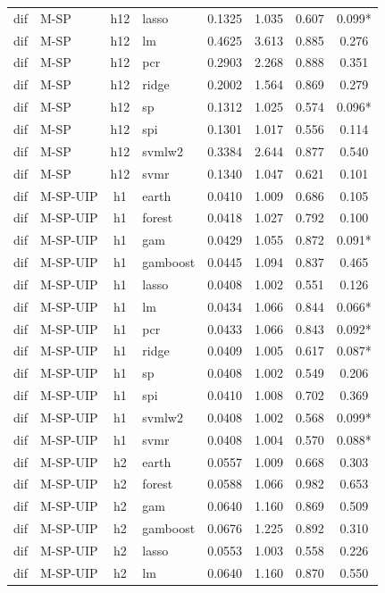 \begin{ThreePartTable}
\begin{longtable}[t]{llclcccc}
dif & M-SP & h12 & lasso & 0.1325 & 1.035 & 0.607 & 0.099*\\
dif & M-SP & h12 & lm & 0.4625 & 3.613 & 0.885 & 0.276\\
dif & M-SP & h12 & pcr & 0.2903 & 2.268 & 0.888 & 0.351\\
dif & M-SP & h12 & ridge & 0.2002 & 1.564 & 0.869 & 0.279\\
dif & M-SP & h12 & sp & 0.1312 & 1.025 & 0.574 & 0.096*\\
dif & M-SP & h12 & spi & 0.1301 & 1.017 & 0.556 & 0.114\\
dif & M-SP & h12 & svmlw2 & 0.3384 & 2.644 & 0.877 & 0.540\\
dif & M-SP & h12 & svmr & 0.1340 & 1.047 & 0.621 & 0.101\\
\addlinespace
dif & M-SP-UIP & h1 & earth & 0.0410 & 1.009 & 0.686 & 0.105\\
dif & M-SP-UIP & h1 & forest & 0.0418 & 1.027 & 0.792 & 0.100\\
dif & M-SP-UIP & h1 & gam & 0.0429 & 1.055 & 0.872 & 0.091*\\
dif & M-SP-UIP & h1 & gamboost & 0.0445 & 1.094 & 0.837 & 0.465\\
dif & M-SP-UIP & h1 & lasso & 0.0408 & 1.002 & 0.551 & 0.126\\
dif & M-SP-UIP & h1 & lm & 0.0434 & 1.066 & 0.844 & 0.066*\\
dif & M-SP-UIP & h1 & pcr & 0.0433 & 1.066 & 0.843 & 0.092*\\
dif & M-SP-UIP & h1 & ridge & 0.0409 & 1.005 & 0.617 & 0.087*\\
dif & M-SP-UIP & h1 & sp & 0.0408 & 1.002 & 0.549 & 0.206\\
dif & M-SP-UIP & h1 & spi & 0.0410 & 1.008 & 0.702 & 0.369\\
dif & M-SP-UIP & h1 & svmlw2 & 0.0408 & 1.002 & 0.568 & 0.099*\\
dif & M-SP-UIP & h1 & svmr & 0.0408 & 1.004 & 0.570 & 0.088*\\
\addlinespace
dif & M-SP-UIP & h2 & earth & 0.0557 & 1.009 & 0.668 & 0.303\\
dif & M-SP-UIP & h2 & forest & 0.0588 & 1.066 & 0.982 & 0.653\\
dif & M-SP-UIP & h2 & gam & 0.0640 & 1.160 & 0.869 & 0.509\\
dif & M-SP-UIP & h2 & gamboost & 0.0676 & 1.225 & 0.892 & 0.310\\
dif & M-SP-UIP & h2 & lasso & 0.0553 & 1.003 & 0.558 & 0.226\\
dif & M-SP-UIP & h2 & lm & 0.0640 & 1.160 & 0.870 & 0.550\\

\end{longtable}
\end{ThreePartTable}
